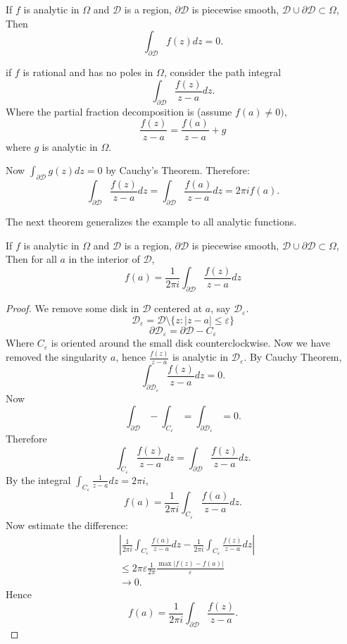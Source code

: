 
\begin{theorem}
	If $f$ is analytic in $\Omega$ and $\mathcal{D}$ is a region, $\partial \mathcal{D}$ is piecewise smooth, $\mathcal{D} \cup \partial \mathcal{D} \subset \Omega$, Then \[
		\int _{\partial \mathcal{D}}f(z) dz = 0
	.\] 
\end{theorem}

\begin{example}
	if $f$ is rational and has no poles in $\Omega$, consider the path integral \[
		\int _{\partial \mathcal{D}} \frac{f(z)}{z - a}dz
	.\] 
	Where the partial fraction decomposition is (assume $f(a) \neq  0),$
	\[
		\frac{f(z)}{z - a} = \frac{f(a)}{z - a}+ g
	\] 
	where $g$ is analytic in $\Omega$.

	Now $\int_{\partial \mathcal{D}} g(z) dz= 0$ by Cauchy's Theorem. Therefore: \[
		\int_{\partial \mathcal{D}}\frac{f(z)}{z - a}dz 
		= \int_{\partial \mathcal{D}}\frac{f(a)}{z - a}dz
		= 2 \pi i f(a)
	.\] 
\end{example}

The next theorem generalizes the example to all analytic functions.

\begin{corollary}
	If $f$ is analytic in $\Omega$ and $\mathcal{D}$ is a region, $\partial \mathcal{D}$ is piecewise smooth, $\mathcal{D} \cup \partial \mathcal{D} \subset \Omega$, Then for all $a$ in the interior of $\mathcal{D}$,
	\[
		f(a) = \frac{1}{2 \pi i } \int_{\partial \mathcal{D}} \frac{f(z)}{z-a}dz
	\]
\end{corollary}
\begin{proof}
	We remove some disk in $\mathcal{D}$ centered at $a$, say $\mathcal{D}_{\varepsilon}$.
	\[
		\mathcal{D}_\varepsilon = \mathcal{D} \setminus \{z: |z-a| \le \varepsilon\} 
	\] 
	\[
		\partial \mathcal{D}_\varepsilon = \partial \mathcal{D} - C_\varepsilon
	\] 
	Where $C_\varepsilon$ is oriented around the small disk counterclockwise. Now we have removed the singularity $a$, hence
	$\frac{f(z)}{z-a}$ is analytic in $\mathcal{D}_\varepsilon$. By Cauchy Theorem, \[
		\int _{\partial \mathcal{D}_\varepsilon} \frac{f(z)}{z-a}dz = 0
	.\] 
	Now \[
		\int _{\partial\mathcal{D}} - \int _{C_\varepsilon} = \int _{\partial\mathcal{D}_\varepsilon} = 0
	.\] 
	Therefore
	\[
		\int _{C_\varepsilon}\frac{f(z)}{z-a}dz
		=\int _{\partial \mathcal{D}}\frac{f(z)}{z-a}dz 
	.\] 
	By the integral $\int _{C_\varepsilon}\frac{1}{z-a}dz = 2 \pi i$,
	\[
		f(a) = \frac{1}{2 \pi i} \int _{C_\varepsilon} \frac{f(a)}{z - a}dz
	.\] 
Now estimate the difference:
\begin{align*}
	&\left| \frac{1}{2 \pi i}\int _{C_\varepsilon}\frac{f(a)}{z-a}dz 
	- \frac{1}{2 \pi i} \int _{C_\varepsilon} \frac{f(z)}{z-a} dz\right| \\
	&\le 2 \pi \varepsilon \frac{1}{2\pi} \frac{\max |f(z) - f(a)|}{\varepsilon}\\
	&\to 0 
.\end{align*}
Hence \[
	f(a) = \frac{1}{2 \pi i} \int_{\partial \mathcal{D}}\frac{f(z)}{z-a}
.\]
\end{proof}


